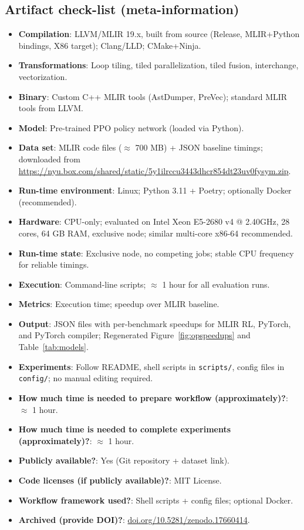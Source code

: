 \documentclass[10pt,twocolumn]{article}
\begin{document}
\subsection{Artifact check-list (meta-information)}
\begin{itemize}
\item \textbf{Compilation}: LLVM/MLIR 19.x, built from source (Release, MLIR+Python bindings, X86 target); Clang/LLD; CMake+Ninja.
\item \textbf{Transformations}: Loop tiling, tiled parallelization, tiled fusion, interchange, vectorization.
\item \textbf{Binary}: Custom C++ MLIR tools (AstDumper, PreVec); standard MLIR tools from LLVM.
\item \textbf{Model}: Pre-trained PPO policy network (loaded via Python).
\item \textbf{Data set}: MLIR code files ($\approx$ 700 MB) + JSON baseline timings; downloaded from \url{https://nyu.box.com/shared/static/5y1ilrccu3443dhcr854dt23uv0fysym.zip}.
\item \textbf{Run-time environment}: Linux; Python 3.11 + Poetry; optionally Docker (recommended).
\item \textbf{Hardware}: CPU-only; evaluated on Intel Xeon E5-2680 v4 @ 2.40GHz, 28 cores, 64 GB RAM, exclusive node; similar multi-core x86-64 recommended.
\item \textbf{Run-time state}: Exclusive node, no competing jobs; stable CPU frequency for reliable timings.
\item \textbf{Execution}: Command-line scripts; $\approx$ 1 hour for all evaluation runs.
\item \textbf{Metrics}: Execution time; speedup over MLIR baseline.
\item \textbf{Output}: JSON files with per-benchmark speedups for MLIR RL, PyTorch, and PyTorch compiler; Regenerated Figure~\ref{fig:opspeedups} and Table~\ref{tab:models}.
\item \textbf{Experiments}: Follow README, shell scripts in \texttt{scripts/}, config files in \texttt{config/}; no manual editing required.
\item \textbf{How much time is needed to prepare workflow (approximately)?}: $\approx$ 1 hour.
\item \textbf{How much time is needed to complete experiments (approximately)?}: $\approx$ 1 hour.
\item \textbf{Publicly available?}: Yes (Git repository + dataset link).
\item \textbf{Code licenses (if publicly available)?}: MIT License.
\item \textbf{Workflow framework used?}: Shell scripts + config files; optional Docker.
\item \textbf{Archived (provide DOI)?}: \url{doi.org/10.5281/zenodo.17660414}.
\end{itemize}
\end{document}
